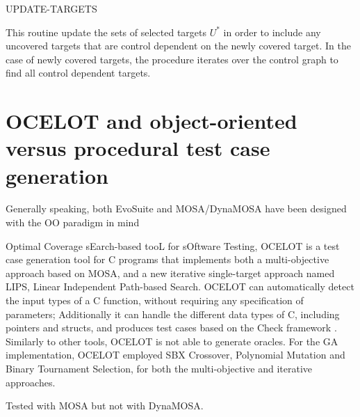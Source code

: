 \begin{algorithm}[H]
    \caption{UPDATE-TARGETS}


    \DontPrintSemicolon   

    
     {
    }
\end{algorithm}

This routine update the sets of selected targets $ U^* $ in order to include any uncovered targets that are control dependent on the newly covered target.
In the case of newly covered targets, the procedure iterates over the control graph to find all control dependent targets.








\newpage
\section{OCELOT and object-oriented versus procedural test case generation}
Generally speaking, both EvoSuite and MOSA/DynaMOSA have been designed with the OO paradigm in mind

Optimal Coverage sEarch-based tooL for sOftware Testing, OCELOT \cite{DBLP:conf/ssbse/ScalabrinoGNOL16} is a test case generation tool for C programs that implements both a multi-objective approach based on MOSA, and a new iterative single-target approach named LIPS, Linear Independent Path-based Search.
OCELOT can automatically detect the input types of a C function, without requiring any specification of parameters; Additionally it can handle the different data types of C, including pointers and structs, and produces test cases based on the Check framework \cite{Check}.
Similarly to other tools, OCELOT is not able to generate oracles.
For the GA implementation, OCELOT employed SBX Crossover, Polynomial Mutation and Binary Tournament Selection, for both the multi-objective and iterative approaches.

Tested with MOSA but not with DynaMOSA.